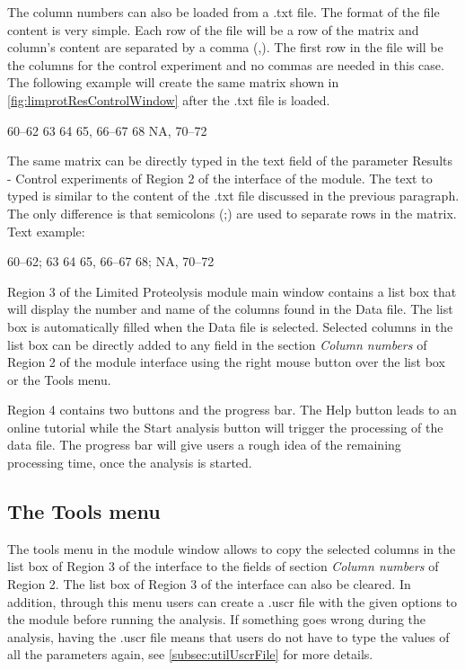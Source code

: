 The column numbers can also be loaded from a .txt file. The format of the file content is very simple. Each row of the file will be a row of the matrix and column's content are separated by a comma (,). The first row in the file will be the columns for the control experiment and no commas are needed in this case. The following example will create the same matrix shown in \autoref{fig:limprotResControlWindow} after the .txt file is loaded.

\numrange[range-phrase=--]{60}{62}\newline
\num{63} \num{64} \num{65}, \numrange[range-phrase=--]{66}{67} \num{68}\newline
NA, \numrange[range-phrase=--]{70}{72} 

The same matrix can be directly typed in the text field of the parameter Results - Control experiments of Region \num{2} of the interface of the module. The text to typed is similar to the content of the .txt file discussed in the previous paragraph. The only difference is that semicolons (;) are used to separate rows in the matrix. Text example:

\numrange[range-phrase=--]{60}{62}; \num{63} \num{64} \num{65}, \numrange[range-phrase=--]{66}{67} \num{68}; NA, \numrange[range-phrase=--]{70}{72}

Region \num{3} of the Limited Proteolysis module main window contains a list box that will display the number and name of the columns found in the Data file. The list box is automatically filled when the Data file is selected. Selected columns in the list box can be directly added to any field in the section \textit{Column numbers} of Region \num{2} of the module interface using the right mouse button over the list box or the Tools menu.

Region \num{4} contains two buttons and the progress bar. The Help button leads to an online tutorial while the Start analysis button will trigger the processing of the data file. The progress bar will give users a rough idea of the remaining processing time, once the analysis is started.

\subsection{The Tools menu}

The tools menu in the module window allows to copy the selected columns in the list box of Region \num{3} of the interface to the fields of section \textit{Column numbers} of Region \num{2}. The list box of Region \num{3} of the interface can also be cleared. In addition, through this menu users can create a .uscr file with the given options to the module before running the analysis. If something goes wrong during the analysis, having the .uscr file means that users do not have to type the values of all the parameters again, see \autoref{subsec:utilUscrFile} for more details. 

